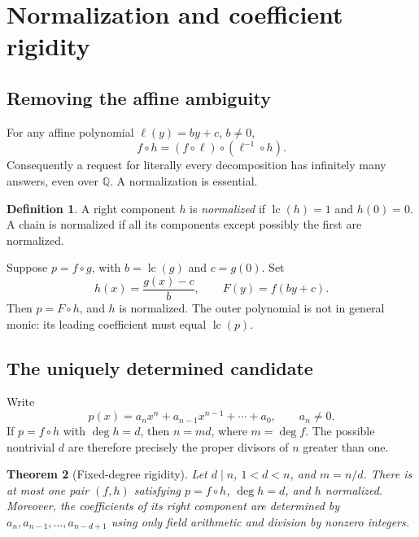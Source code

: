 \documentclass[11pt,letterpaper]{article}
\newtheorem{theorem}{Theorem}[section]
\theoremstyle{definition}
\newtheorem{definition}[theorem]{Definition}
\theoremstyle{remark}
\newcommand{\Q}{\mathbb Q}
\newcommand{\lc}{\operatorname{lc}}
\begin{document}
\section{Normalization and coefficient rigidity}
\label{sec:rigidity}

\subsection{Removing the affine ambiguity}
For any affine polynomial $\ell(y)=by+c$, $b\ne0$,
\[
 f\circ h=(f\circ\ell)\circ(\ell^{-1}\circ h).
\]
Consequently a request for literally every decomposition has infinitely
many answers, even over $\Q$. A normalization is essential.

\begin{definition}
A right component $h$ is \emph{normalized} if $\lc(h)=1$ and $h(0)=0$.
A chain is normalized if all its components except possibly the first
are normalized.
\end{definition}

Suppose $p=f\circ g$, with $b=\lc(g)$ and $c=g(0)$. Set
\begin{equation}\label{eq:normalization}
 h(x)=\frac{g(x)-c}{b},\qquad F(y)=f(by+c).
\end{equation}
Then $p=F\circ h$, and $h$ is normalized. The outer polynomial is not in
general monic: its leading coefficient must equal $\lc(p)$.

\subsection{The uniquely determined candidate}
Write
\[
 p(x)=a_nx^n+a_{n-1}x^{n-1}+\cdots+a_0,\qquad a_n\ne0.
\]
If $p=f\circ h$ with $\deg h=d$, then $n=md$, where $m=\deg f$.
The possible nontrivial $d$ are therefore precisely the proper divisors of
$n$ greater than one.

\begin{theorem}[Fixed-degree rigidity]\label{thm:rigidity}
Let $d\mid n$, $1<d<n$, and $m=n/d$. There is at most one pair
$(f,h)$ satisfying $p=f\circ h$, $\deg h=d$, and $h$ normalized.
Moreover, the coefficients of its right component are determined by
$a_n,a_{n-1},\ldots,a_{n-d+1}$ using only field arithmetic and division
by nonzero integers.
\end{theorem}
\end{document}
